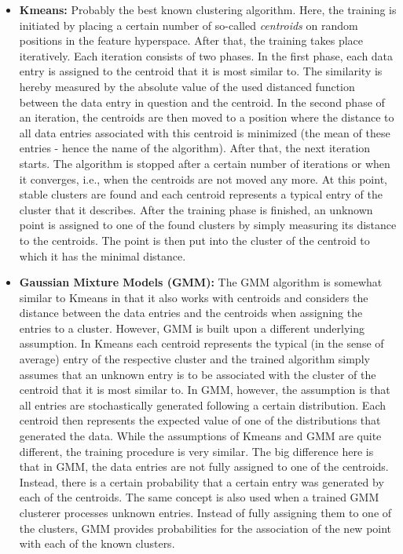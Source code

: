\begin{itemize}
	\item \textbf{Kmeans:} Probably the best known clustering algorithm. Here, the training is initiated by placing a certain number of so-called \emph{centroids} on random positions in the feature hyperspace. After that, the training takes place iteratively. Each iteration consists of two phases. In the first phase, each data entry is assigned to the centroid that it is most similar to. The similarity is hereby measured by the absolute value of the used distanced function between the data entry in question and the centroid. In the second phase of an iteration, the centroids are then moved to a position where the distance to all data entries associated with this centroid is minimized (the mean of these entries - hence the name of the algorithm). After that, the next iteration starts. The algorithm is stopped after a certain number of iterations or when it converges, i.e., when the centroids are not moved any more. At this point, stable clusters are found and each centroid represents a typical entry of the cluster that it describes. After the training phase is finished, an unknown point is assigned to one of the found clusters by simply measuring its distance to the centroids. The point is then put into the cluster of the centroid to which it has the minimal distance. 
	
	\item \textbf{Gaussian Mixture Models (GMM):} The GMM algorithm is somewhat similar to Kmeans in that it also works with centroids and considers the distance between the data entries and the centroids when assigning the entries to a cluster. However, GMM is built upon a different underlying assumption. In Kmeans each centroid represents the typical (in the sense of average) entry of the respective cluster and the trained algorithm simply assumes that an unknown entry is to be associated with the cluster of the centroid that it is most similar to. In GMM, however, the assumption is that all entries are stochastically generated following a certain distribution. Each centroid then represents the expected value of one of the distributions that generated the data. While the assumptions of Kmeans and GMM are quite different, the training procedure is very similar. The big difference here is that in GMM, the data entries are not fully assigned to one of the centroids. Instead, there is a certain probability that a certain entry was generated by each of the centroids. The same concept is also used when a trained GMM clusterer processes unknown entries. Instead of fully assigning them to one of the clusters, GMM provides probabilities for the association of the new point with each of the known clusters. 
	

\end{itemize}
